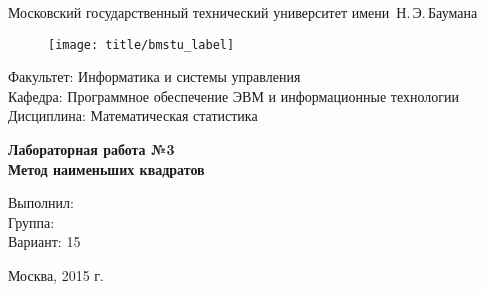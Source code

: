 
\thispagestyle{empty}

\begin{center}
    \Large
    Московский государственный технический университет имени~Н.\,Э.\,Баумана
\end{center}

\begin{figure}[h!]
    \begin{center}
        \texttt{[image: title/bmstu\_label]}
    \end{center}
\end{figure}

{\large
\noindent
Факультет: Информатика и системы управления\\[2mm]
\noindent
Кафедра: Программное обеспечение ЭВМ и информационные технологии\\[2mm]
\noindent
Дисциплина: Математическая статистика
\vspace{1.5cm}}

\begin{center}
    \Large
    \textbf{Лабораторная работа №3} \\
    \textbf{Метод наименьших квадратов} \\
\end{center}
\vfill

\hfill\begin{minipage}{0.35\textwidth}
    Выполнил: \\
    Группа: \\
    Вариант: 15
\end{minipage}
\vfill

\begin{center}
    Москва, 2015 г.
\end{center}
